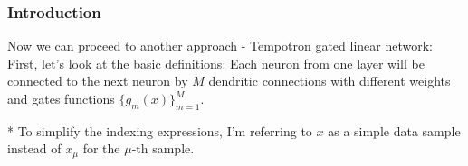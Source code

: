 \subsubsection{Introduction}

Now we can proceed to another approach - Tempotron gated linear network: 
First, let's look at the basic definitions:
Each neuron from one layer will be connected to the next neuron by \(M\) dendritic connections with different weights and gates functions \( \{ g_m(x) \}^M_{m=1}\).

* To simplify the indexing expressions, I'm referring to \(x\) as a simple data sample instead of \(x_{\mu}\) for the \(\mu\)-th sample.
